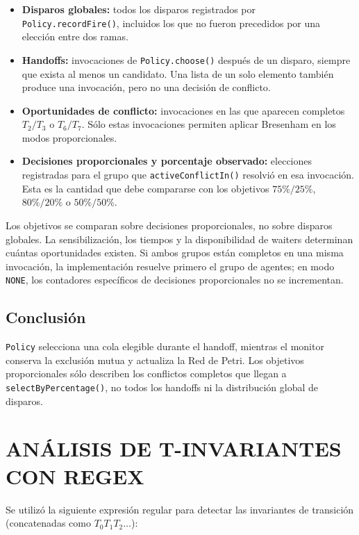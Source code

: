 \documentclass[11pt,a4paper]{article}
\begin{document}
\begin{itemize}
    \item \textbf{Disparos globales:} todos los disparos registrados por \texttt{Policy.recordFire()}, incluidos los que no fueron precedidos por una elección entre dos ramas.
    \item \textbf{Handoffs:} invocaciones de \texttt{Policy.choose()} después de un disparo, siempre que exista al menos un candidato. Una lista de un solo elemento también produce una invocación, pero no una decisión de conflicto.
    \item \textbf{Oportunidades de conflicto:} invocaciones en las que aparecen completos $T_2/T_3$ o $T_6/T_7$. Sólo estas invocaciones permiten aplicar Bresenham en los modos proporcionales.
    \item \textbf{Decisiones proporcionales y porcentaje observado:} elecciones registradas para el grupo que \texttt{activeConflictIn()} resolvió en esa invocación. Esta es la cantidad que debe compararse con los objetivos $75\%/25\%$, $80\%/20\%$ o $50\%/50\%$.
\end{itemize}

Los objetivos se comparan sobre decisiones proporcionales, no sobre disparos globales. La sensibilización, los tiempos y la disponibilidad de waiters determinan cuántas oportunidades existen. Si ambos grupos están completos en una misma invocación, la implementación resuelve primero el grupo de agentes; en modo \texttt{NONE}, los contadores específicos de decisiones proporcionales no se incrementan.

\subsection{Conclusión}

\texttt{Policy} selecciona una cola elegible durante el handoff, mientras el monitor conserva la exclusión mutua y actualiza la Red de Petri. Los objetivos proporcionales sólo describen los conflictos completos que llegan a \texttt{selectByPercentage()}, no todos los handoffs ni la distribución global de disparos.


\section{ANÁLISIS DE T-INVARIANTES CON REGEX}

Se utilizó la siguiente expresión regular para detectar las invariantes de transición (concatenadas como $T_0T_1T_2\dots$):
\end{document}
